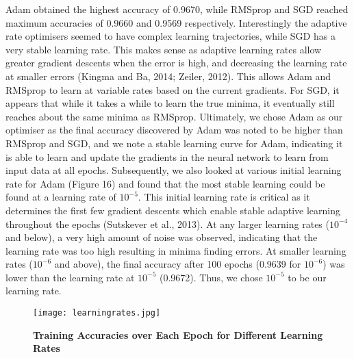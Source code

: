 \documentclass{article}
\begin{document}
Adam obtained the highest accuracy of 0.9670, while RMSprop and SGD reached maximum accuracies of 0.9660 and 0.9569 respectively. Interestingly the adaptive rate optimisers seemed to have complex learning trajectories, while SGD has a very stable learning rate. This makes sense as adaptive learning rates allow greater gradient descents when the error is high, and decreasing the learning rate at smaller errors (Kingma and Ba, 2014; Zeiler, 2012). This allows Adam and RMSprop to learn at variable rates based on the current gradients. For SGD, it appears that while it takes a while to learn the true minima, it eventually still reaches about the same minima as RMSprop. Ultimately, we chose Adam as our optimiser as the final accuracy discovered by Adam was noted to be higher than RMSprop and SGD, and we note a stable learning curve for Adam, indicating it is able to learn and update the gradients in the neural network to learn from input data at all epochs. Subsequently, we also looked at various initial learning rate for Adam (Figure 16) and found that the most stable learning could be found at a learning rate of $10^{-5}$. This initial learning rate is critical as it determines the first few gradient descents which enable stable adaptive learning throughout the epochs (Sutskever et al., 2013). At any larger learning rates ($10^{-4}$ and below), a very high amount of noise was observed, indicating that the learning rate was too high resulting in minima finding errors. At smaller learning rates ($10^{-6}$ and above), the final accuracy after 100 epochs (0.9639 for $10^{-6}$) was lower than the learning rate at $10^{-5}$ (0.9672). Thus, we chose $10^{-5}$ to be our learning rate.
\begin{figure}[H]
\texttt{[image: learningrates.jpg]}
\centering
\caption{\textbf{Training Accuracies over Each Epoch for Different Learning Rates}}
\end{figure}
\end{document}
